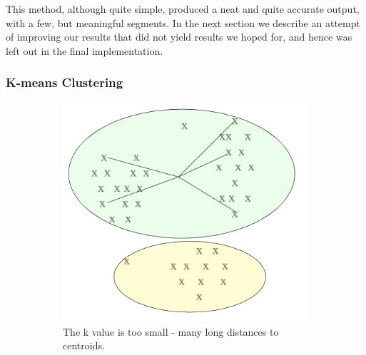 This method, although quite simple, produced a neat and quite accurate output, with a few, but meaningful segments. In the next section we describe an attempt of improving our results that did not yield results we hoped for, and hence was left out in the final implementation.

\subsubsection*{K-means Clustering}
\label{sec:kmeans}

\begin{figure}[b]
        \centering
        \begin{subfigure}[t]{0.30\textwidth}
                \includegraphics[width=\textwidth]{Figures/underfitting}
                \caption{The k value is too small - many long distances to centroids.}
                \label{fig:underfitting}
        \end{subfigure}%
        \begin{subfigure}[t]{0.30\textwidth}

\end{subfigure}
\end{figure}
